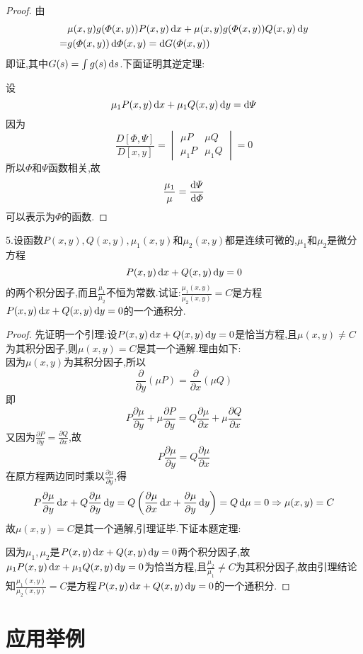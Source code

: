\begin{proof}
由
\[\begin{split}
&\mu(x,y)g(\varPhi(x,y))P(x,y)\mathop{}\!\mathrm{d} x+\mu(x,y)g(\varPhi(x,y))Q(x,y)\mathop{}\!\mathrm{d} y\\
=&g(\varPhi(x,y))\mathop{}\!\mathrm{d}\varPhi(x,y)=\mathop{}\!\mathrm{d} G(\varPhi(x,y))
\end{split}\]
即证,其中$G(s)=\int g(s)\mathop{}\!\mathrm{d} s$.下面证明其逆定理:

设
\[\mu_1P(x,y)\mathop{}\!\mathrm{d} x+\mu_1Q(x,y)\mathop{}\!\mathrm{d} y=\mathop{}\!\mathrm{d}\varPsi\]
因为
\[\frac{D[\varPhi,\varPsi]}{D[x,y]}=
\begin{vmatrix}\mu P&\mu Q\\\mu_1P&\mu_1Q\end{vmatrix}=0\]
所以$\varPhi$和$\varPsi$函数相关,故 
\[\frac{\mu_1}{\mu}=\frac{\mathop{}\!\mathrm{d}\varPsi}{\mathop{}\!\mathrm{d}\varPhi}\]
可以表示为$\varPhi$的函数.
\end{proof}


5.设函数$P(x,y),Q(x,y),\mu_1(x,y)$和$\mu_2(x,y)$都是连续可微的,$\mu_1$和$\mu_2$是微分方程
\[P(x,y)\mathop{}\!\mathrm{d} x+Q(x,y)\mathop{}\!\mathrm{d} y=0\]
的两个积分因子,而且$\frac{\mu_1}{\mu_2}$不恒为常数.试证:$\frac{\mu_1(x,y)}{\mu_2(x,y)}=C$是方程$P(x,y)\mathop{}\!\mathrm{d} x+Q(x,y)\mathop{}\!\mathrm{d} y=0$的一个通积分.
\begin{proof}先证明一个引理:设$P(x,y)\mathop{}\!\mathrm{d} x+Q(x,y)\mathop{}\!\mathrm{d} y=0$是恰当方程,且$\mu(x,y)\neq C$为其积分因子,则$\mu(x,y)=C$是其一个通解.理由如下:\\
因为$\mu(x,y)$为其积分因子,所以
\[\frac{\partial}{\partial y}(\mu P)=\frac{\partial}{\partial x}(\mu Q)\]
即\[P\frac{\partial\mu}{\partial y}+\mu\frac{\partial P}{\partial y}=Q\frac{\partial\mu}{\partial x}+\mu\frac{\partial Q}{\partial x}\]
又因为$\frac{\partial P}{\partial y}=\frac{\partial Q}{\partial x}$,故
\[P\frac{\partial\mu}{\partial y}=Q\frac{\partial\mu}{\partial x}\]
在原方程两边同时乘以$\frac{\partial\mu}{\partial y}$,得
\[
P\frac{\partial\mu}{\partial y}\mathop{}\!\mathrm{d} x+Q\frac{\partial\mu}{\partial y}\mathop{}\!\mathrm{d} y
=Q\left(\frac{\partial\mu}{\partial x}\mathop{}\!\mathrm{d} x+\frac{\partial\mu}{\partial y}\mathop{}\!\mathrm{d} y\right)
=Q\mathop{}\!\mathrm{d}\mu=0\Rightarrow\mu(x,y)=C\]
故$\mu(x,y)=C$是其一个通解,引理证毕.下证本题定理:

因为$\mu_1,\mu_2$是$P(x,y)\mathop{}\!\mathrm{d} x+Q(x,y)\mathop{}\!\mathrm{d} y=0$两个积分因子,故$\mu_1P(x,y)\mathop{}\!\mathrm{d} x+\mu_1Q(x,y)\mathop{}\!\mathrm{d} y=0$为恰当方程,且$\frac{\mu_2}{\mu_1}\neq C$为其积分因子,故由引理结论知$\frac{\mu_1(x,y)}{\mu_2(x,y)}=C$是方程$P(x,y)\mathop{}\!\mathrm{d} x+Q(x,y)\mathop{}\!\mathrm{d} y=0$的一个通积分.
\end{proof}


\section{应用举例}


